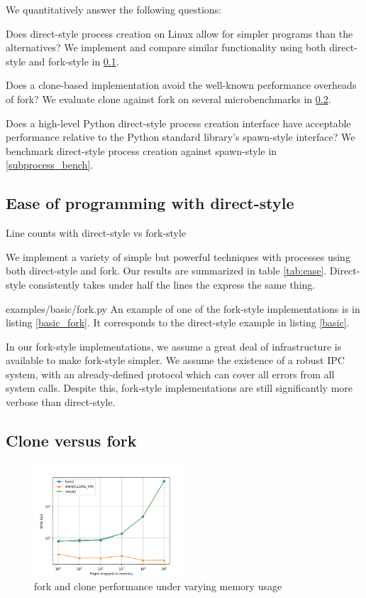 \documentclass[letterpaper,twocolumn,10pt]{article}
\begin{document}
We quantitatively answer the following questions:
\begin{compactitem}
\item
  Does direct-style process creation on Linux allow for simpler programs than the alternatives?
  We implement and compare similar functionality using both direct-style and fork-style in \ref{ease}.
\item
  Does a clone-based implementation avoid the well-known performance overheads of fork?
  We evaluate clone against fork on several microbenchmarks in \ref{microbench}.
\item
  Does a high-level Python direct-style process creation interface
  have acceptable performance relative to the Python standard library's spawn-style interface?
  We benchmark direct-style process creation against spawn-style in \ref{subprocess_bench}.
\end{compactitem}
\subsection{Ease of programming with direct-style}\label{ease}
\begin{table}

\caption{Line counts with direct-style vs fork-style}
\label{tab:ease}
\end{table}
We implement a variety of simple but powerful techniques with processes
using both direct-style and fork.
Our results are summarized in table \ref{tab:ease}.
Direct-style consistently takes under half the lines the express the same thing.

{examples/basic/fork.py}
An example of one of the fork-style implementations is in listing \ref{basic_fork}.
It corresponds to the direct-style example in listing \ref{basic}.

In our fork-style implementations,
we assume a great deal of infrastructure is available to make fork-style simpler.
We assume the existence of a robust IPC system,
with an already-defined protocol which can cover all errors from all system calls.
Despite this, fork-style implementations are still significantly more verbose than direct-style.
\subsection{Clone versus fork}\label{microbench}
\begin{figure}[h!]
\centering
 \includegraphics[width=0.5\textwidth]{microbench}
 \caption{fork and clone performance under varying memory usage}
 \label{fig:microbench}
\end{figure}
\end{document}
